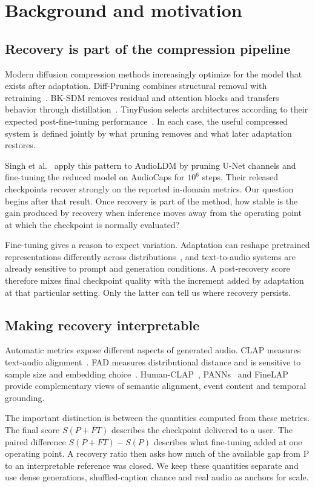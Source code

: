 \documentclass{article}
\newcommand{\PFT}{P{+}FT}
\begin{document}
\section{Background and motivation}
\subsection{Recovery is part of the compression pipeline}
Modern diffusion compression methods increasingly optimize for the model that exists after adaptation. Diff-Pruning combines structural removal with retraining~\cite{fang2023diffpruning}. BK-SDM removes residual and attention blocks and transfers behavior through distillation~\cite{kim2024bksdm}. TinyFusion selects architectures according to their expected post-fine-tuning performance~\cite{fang2025tinyfusion}. In each case, the useful compressed system is defined jointly by what pruning removes and what later adaptation restores.

Singh et al.~\cite{singh2026pruning} apply this pattern to AudioLDM by pruning U-Net channels and fine-tuning the reduced model on AudioCaps for $10^{6}$ steps. Their released checkpoints recover strongly on the reported in-domain metrics. Our question begins after that result. Once recovery is part of the method, how stable is the gain produced by recovery when inference moves away from the operating point at which the checkpoint is normally evaluated?

Fine-tuning gives a reason to expect variation. Adaptation can reshape pretrained representations differently across distributions~\cite{kumar2022finetuning}, and text-to-audio systems are already sensitive to prompt and generation conditions. A post-recovery score therefore mixes final checkpoint quality with the increment added by adaptation at that particular setting. Only the latter can tell us where recovery persists.

\subsection{Making recovery interpretable}
Automatic metrics expose different aspects of generated audio. CLAP measures text-audio alignment~\cite{wu2023clap}. FAD measures distributional distance and is sensitive to sample size and embedding choice~\cite{kilgour2019fad,gui2024fad,chung2025kad}. Human-CLAP~\cite{takano2025humanclap}, PANNs~\cite{kong2020panns} and FineLAP~\cite{li2026finelap} provide complementary views of semantic alignment, event content and temporal grounding.

The important distinction is between the quantities computed from these metrics. The final score $S(\PFT)$ describes the checkpoint delivered to a user. The paired difference $S(\PFT)-S(P)$ describes what fine-tuning added at one operating point. A recovery ratio then asks how much of the available gap from P to an interpretable reference was closed. We keep these quantities separate and use dense generations, shuffled-caption chance and real audio as anchors for scale.
\end{document}

